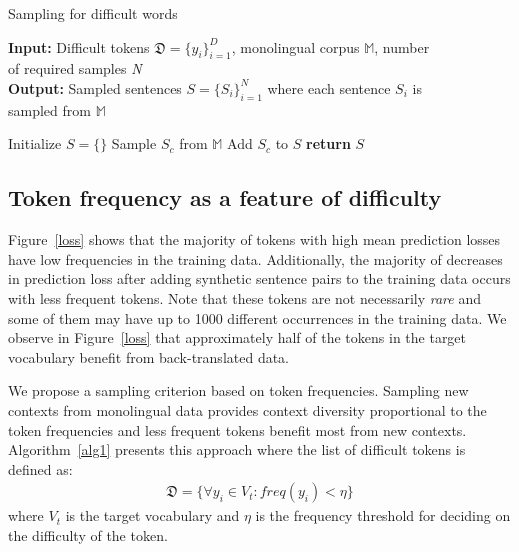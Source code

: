 {\centering
\begin{minipage}{.85\linewidth}
\begin{algorithm}[H]
\caption{Sampling for difficult words}\label{alg1}
 \hspace*{\algorithmicindent} {\textbf{Input:}} Difficult tokens \textit{$\mathfrak{D}=\{y_i\}_{i=1}^{D}$}, monolingual 
corpus \textit{$\mathbb{M}$}, number \\
\hspace*{\algorithmicindent} of required samples \textit{N}   \\
\hspace*{\algorithmicindent} {\textbf{Output:}} Sampled sentences $S=\{S_i\}_{i=1}^{N}$ where each
sentence $S_i$ is \\
\hspace*{\algorithmicindent} sampled from $\mathbb{M}$
 \begin{algorithmic}[1]
\State Initialize $S=\{\}$ %
\Repeat
\State Sample $S_c$ from $\mathbb{M}$
	\State Add $S_c$ to $S$
\EndFor
{}
\State \textbf{return} $S$ %
\EndProcedure
\end{algorithmic}
\end{algorithm}
\end{minipage}
\par
}
\vspace{\baselineskip}%


\subsection{Token frequency as a feature of difficulty} 

Figure~\ref{loss} shows that the majority of tokens with high mean prediction losses have low frequencies in the training data.
Additionally, the majority of decreases in prediction loss after adding synthetic sentence pairs to the training data occurs with less frequent tokens.
Note that these tokens are not necessarily \textit{rare} and some of them may have up to 1000 different occurrences in the training data.
We observe in Figure~\ref{loss} that approximately half of the tokens in the target vocabulary benefit from back-translated data.

We propose a sampling criterion based on token frequencies. 
Sampling new contexts from monolingual data provides context diversity proportional to the token frequencies and less frequent tokens benefit most from new contexts.
Algorithm~\ref{alg1} presents this approach where the list of difficult tokens is defined as: 
\begin{align}
\mathfrak{D} = \{\forall y_i \in V_t \colon freq(y_i) < \eta \}
\end{align}
\noindent where $V_t$ is the target vocabulary and $\eta$ is the frequency threshold for deciding on the difficulty of the token.


